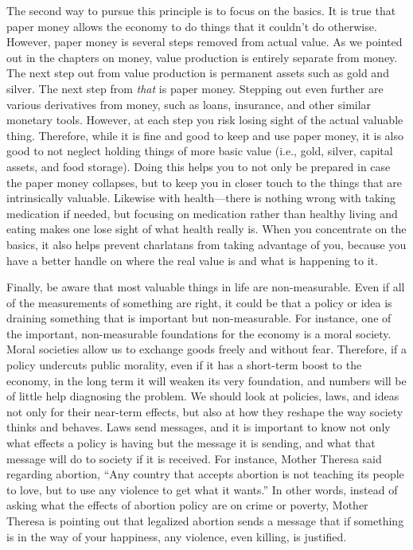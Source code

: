 The second way to pursue this principle is to focus on the basics. It is
true that paper money allows the economy to do things that it
couldn't do otherwise. However, paper money is several
steps removed from actual value. As we pointed out in the chapters on
money, value production is entirely separate from money. The next step
out from value production is permanent assets such as gold and silver.
The next step from \textit{that} is paper money. Stepping out even
further are various derivatives from money, such as loans, insurance,
and other similar monetary tools. However, at each step you risk losing
sight of the actual valuable thing. Therefore, while it is fine and
good to keep and use paper money, it is also good to not neglect
holding things of more basic value
(i.e., gold, silver,
capital assets, and food
storage). Doing this
helps you to not only be prepared in case the paper money collapses,
but to keep
you in closer touch
to the things that are intrinsically valuable. Likewise with
health—there is nothing wrong with taking medication if needed, but
focusing on medication rather than healthy living and eating makes
one lose sight of
what health really
is. When you concentrate on the basics, it also helps prevent
charlatans from taking advantage of you, because you have a better
handle on where the real value is and what is happening to it.

Finally, be aware that most valuable things in life are non-measurable.
Even if all of the measurements of something are right, it could be
that a policy or idea is draining something that is important but
non-measurable.  For
instance, one of the important, non-measurable foundations for the
economy is a moral society.  Moral societies allow us to exchange goods
freely and without fear.  Therefore, if a policy undercuts public
morality, even if it has a short-term boost to the economy, in the long
term it will weaken its very foundation, and numbers will be of little
help diagnosing the problem.  We should look at policies, laws, and
ideas not only for their near-term effects, but also at how they
reshape the way society thinks and behaves. Laws send messages, and it
is important to know not only what effects a policy is having but the
message it is sending, and what that message will do to society if it
is received. For instance, Mother Theresa said
regarding abortion,
“Any country that accepts abortion is not teaching its people to love,
but to use any violence to get what it wants.”  In other words, instead
of asking what the effects of abortion policy are on crime or poverty,
Mother Theresa is pointing out that legalized abortion sends a message
that if something is in the way of your happiness, any violence, even
killing, is justified.  


